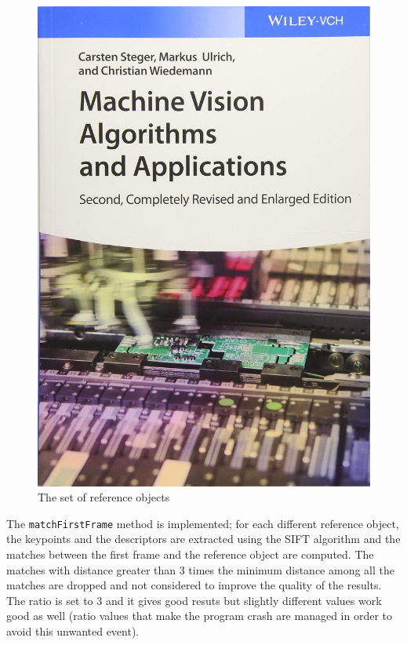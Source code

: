 \documentclass[a4paper,titlepaget]{article}
\begin{document}
\begin{figure}[htpb]
\begin{minipage}{.2\textwidth}
\includegraphics[width=\textwidth, height=0.2\textheight]{images/obj4}
\end{minipage} 
\caption{The set of reference objects}
\end{figure}

The \texttt{matchFirstFrame} method is implemented; for each different reference object, the keypoints and the descriptors are extracted using the SIFT algorithm and the matches between the first frame and the reference object are computed.
The matches with distance greater than 3 times the minimum distance among all the matches are dropped and not considered to improve the quality of the results. 
The ratio is set to 3 and it gives good resuts but slightly different values work good as well (ratio values that make the program crash are managed in order to avoid this unwanted event).
\end{document}
